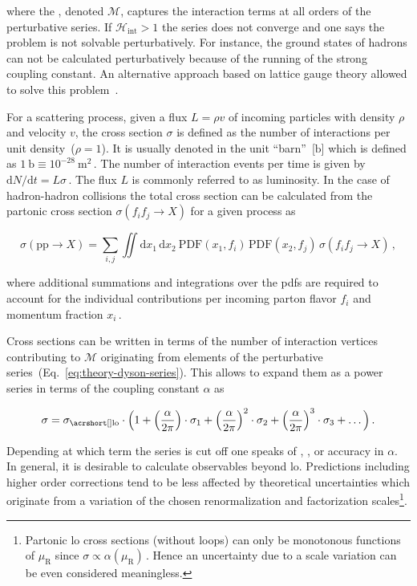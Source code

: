 where the , denoted $\mathcal{M}$, captures the interaction terms at all orders of the perturbative series. If $\mathcal{H}_\mathrm{int}>1$ the series does not converge and one says the problem is not solvable perturbatively. For instance, the ground states of hadrons can not be calculated perturbatively because of the running of the strong coupling constant. An alternative approach based on lattice gauge theory allowed to solve this problem~\cite{Durr:2008zz}. 

For a scattering process, given a flux $L=\rho v$ of incoming particles with density $\rho$ and velocity $v$, the cross section $\sigma$ is defined as the number of interactions per unit density~($\rho=1$). It is usually denoted in the unit ``barn''~[$\mathrm{b}$] which is defined as $1~\mathrm{b}\equiv 10^{-28}~\mathrm{m}^{2}\,$.  The number of interaction events per time is given by $\mathrm{d}N/\mathrm{d}t=L\sigma\,$. The flux $L$ is commonly referred to as luminosity. In the case of hadron-hadron collisions the total cross section can be calculated from the partonic cross section $\sigma(f_{i}f_{j}\to X)$ for a given process  as

\begin{equation}
\sigma(\mathrm{pp}\to X)=\sum_{i,j}\iint\mathrm{d}x_{1}\,\mathrm{d}x_{2}~\mathrm{PDF}(x_{1},f_{i})\,\mathrm{PDF}(x_{2},f_{j})\,\sigma(f_{i}f_{j}\to X)\,,
\end{equation}

where additional summations and integrations over the \glspl{pdf} are required to account for the individual contributions per incoming parton flavor $f_{i}$ and momentum fraction $x_{i}\,$.

Cross sections can be written in terms of the number of interaction vertices contributing to $\mathcal{M}$ originating from elements of the perturbative series~(Eq.~\ref{eq:theory-dyson-series}). This allows to expand them as a power series in terms of the coupling constant $\alpha$ as

\begin{equation}
\sigma=\sigma_\mathrm{\gls{lo}}\cdot\Big(1+\Big(\frac{\alpha}{2\pi}\Big)\cdot\sigma_\mathrm{1}+\Big(\frac{\alpha}{2\pi}\Big)^2\cdot\sigma_{2}+\Big(\frac{\alpha}{2\pi}\Big)^{3}\cdot\sigma_{3}+\ldots\Big)\,.
\end{equation}

Depending at which term the series is cut off one speaks of , , or  accuracy in $\alpha$. In general, it is desirable to calculate observables beyond \gls{lo}. Predictions including higher order corrections tend to be less affected by theoretical uncertainties which originate from a variation of the chosen renormalization and factorization scales\footnote{Partonic \gls{lo} cross sections (without loops) can only be monotonous functions of $\mu_\mathrm{R}$ since $\sigma\propto\alpha(\mu_\mathrm{R})$\,. Hence an uncertainty due to a scale variation can be even considered meaningless.}.

